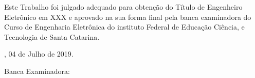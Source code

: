 \documentclass{ifscTCC} %
\begin{document}
%

\begin{folhadeaprovacao}
    \begin{center}
        \begin{center}
            \ABNTEXchapterfont\SingleSpacing\bfseries\Large\MakeUppercase\imprimirtitulo
        \end{center}
            
        \vspace*{2.0cm}
            
        \ABNTEXchapterfont\normalsize\bfseries\MakeUppercase\imprimirautor
            
        \vspace*{1.0cm}
    \end{center}
    
    
    \noindent\OnehalfSpacing Este Trabalho foi julgado adequado para obtenção do Título de Engenheiro Eletrônico em XXX e aprovado na sua forma final pela banca examinadora do Curso de Engenharia Eletrônica do instituto Federal de Educação Ciência, e Tecnologia de Santa Catarina.
        
    \vspace*{1.0cm}
    \begin{center}    
        \imprimirlocal, 04 de Julho de 2019.
    \end{center}
    
    \noindent Banca Examinadora:
    

\end{folhadeaprovacao}
\cleardoublepage
\end{document}
